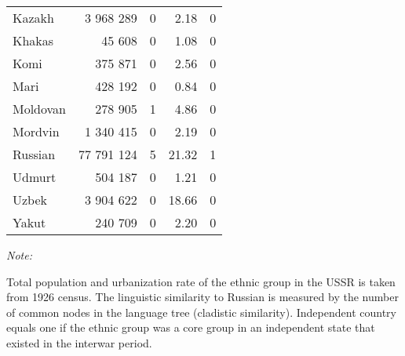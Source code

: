 \begin{table}[t]
\begin{threeparttable}
\begin{tabular}{lrrrr}
Kazakh & 3 968 289 & 0 & 2.18 & 0\\
Khakas & 45 608 & 0 & 1.08 & 0\\
Komi & 375 871 & 0 & 2.56 & 0\\
Mari & 428 192 & 0 & 0.84 & 0\\
Moldovan & 278 905 & 1 & 4.86 & 0\\
Mordvin & 1 340 415 & 0 & 2.19 & 0\\
Russian & 77 791 124 & 5 & 21.32 & 1\\
Udmurt & 504 187 & 0 & 1.21 & 0\\
Uzbek & 3 904 622 & 0 & 18.66 & 0\\
Yakut & 240 709 & 0 & 2.20 & 0\\
\bottomrule
\end{tabular}
\begin{tablenotes}
\item \textit{Note: } 
\item Total population and urbanization rate of the ethnic group in the USSR is taken from 1926 census. The linguistic similarity to Russian is measured by the number of common nodes in the language tree (cladistic similarity). Independent country equals one if the ethnic group was a core group in an independent state that existed in the interwar period.
\end{tablenotes}
\end{threeparttable}
\end{table}